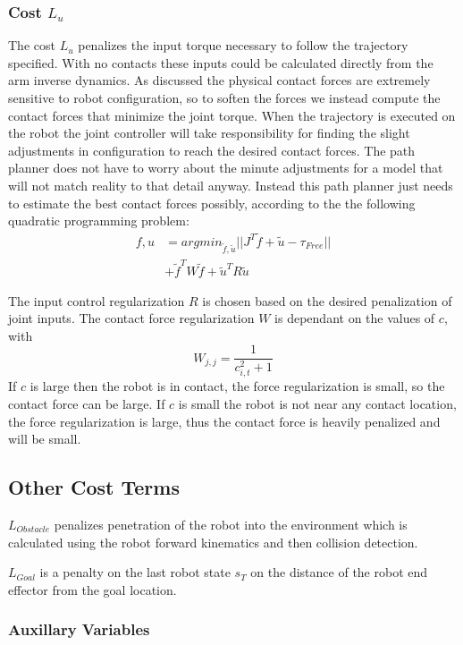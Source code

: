 \documentclass[../thesis.tex]{subfiles}
\begin{document}
\subsubsection{Cost $L_u$}

The cost $L_u$ penalizes the input torque necessary to follow the trajectory specified. With no contacts these inputs could be calculated directly from the arm inverse dynamics. As discussed the physical contact forces are extremely sensitive to robot configuration, so to soften the forces we instead compute the contact forces that minimize the joint torque. When the trajectory is executed on the robot the joint controller will take responsibility for finding the slight adjustments in configuration to reach the desired contact forces. The path planner does not have to worry about the minute adjustments for a model that will not match reality to that detail anyway. Instead this path planner just needs to estimate the best contact forces possibly, according to the the following quadratic programming problem:
\begin{align*}
f, u &= argmin_{\tilde{f}, \tilde{u}} ||J^T\tilde{f} + \tilde{u} - \tau_{Free}|| \\
&+ \tilde{f}^T W \tilde{f} + \tilde{u}^T R \tilde{u}
\end{align*}

The input control regularization $R$ is chosen based on the desired penalization of joint inputs. The contact force regularization $W$ is dependant on the values of $c$, with 
$$W_{j,j} = \frac{1}{c_{i,t}^2 + 1}$$
If $c$ is large then the robot is in contact, the force regularization is small, so the contact force can be large. If $c$ is small the robot is not near any contact location, the force regularization is large, thus the contact force is heavily penalized and will be small. 


\subsection{Other Cost Terms}
$L_{Obstacle}$ penalizes penetration of the robot into the environment which is calculated using the robot forward kinematics and then collision detection.

$L_{Goal}$ is a penalty on the last robot state $s_T$ on the distance of the robot end effector from the goal location.

\subsubsection{Auxillary Variables}
\end{document}
